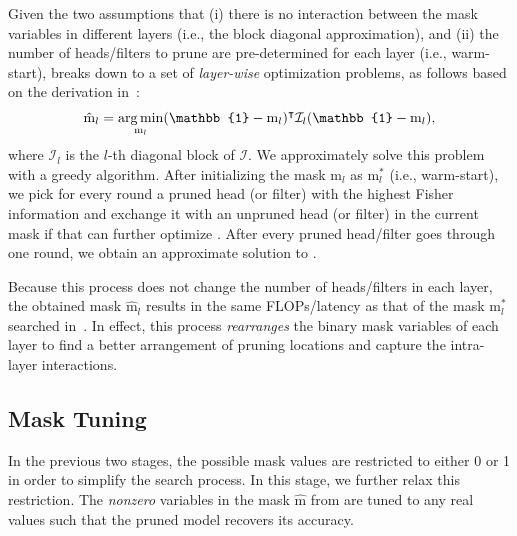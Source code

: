 Given the two assumptions that (i) there is no interaction between the mask variables in different layers (i.e., the block diagonal approximation), and (ii) the number of heads/filters to prune are pre-determined for each layer (i.e., warm-start),  breaks down to a set of \textit{layer-wise} optimization problems, as follows based on the derivation in~:
\begin{gather}
    {\hat{\text{m}}}_l = \argmin_{\text{m}_l} (\mathbb{1} - \text{m}_l)^\intercal \mathcal{I}_l (\mathbb{1} - \text{m}_l), \label{eq:layerwise_opt}
\end{gather}
where $\mathcal{I}_l$ is the $l$-th diagonal block of $\mathcal{I}$.
We approximately solve this problem with a greedy algorithm.
After initializing the mask $\text{m}_l$ as $\text{m}^{\ast}_l$ (i.e., warm-start),
we pick for every round a pruned head (or filter) with the highest Fisher information and exchange it with an unpruned head (or filter) in the current mask if that can further optimize .
After every pruned head/filter goes through one round, we obtain an approximate solution to .

Because this process does not change the number of heads/filters in each layer, the obtained mask $\hat{\text{m}}_l$ results in the same FLOPs/latency as that of the mask $\text{m}^{\ast}_l$ searched in~.
In effect, this process \textit{rearranges} the binary mask variables of each layer to find a better arrangement of pruning locations and capture the intra-layer interactions. 

\subsection{Mask Tuning}
\label{subsec:tuning}
\vspace{-1mm}

In the previous two stages, the possible mask values are restricted to either 0 or 1 in order to simplify the search process.
In this stage, we further relax this restriction.
The \textit{nonzero} variables in the mask $\hat{\text{m}}$ from  are tuned to any real values such that the pruned model recovers its accuracy.

